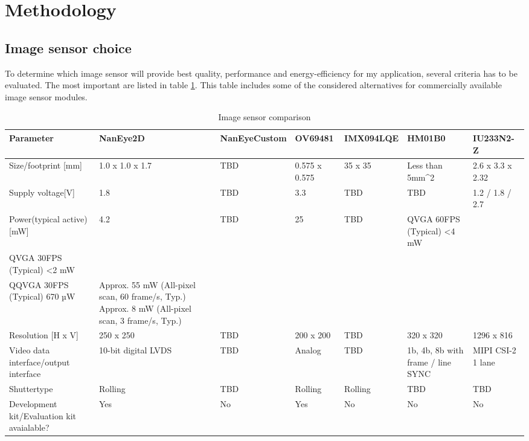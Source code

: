\newpage 
\section{Methodology}
\subsection{Image sensor choice}
To determine which image sensor will provide best quality, performance and energy-efficiency for my application, several criteria has to be evaluated. The most important are listed in table \ref{table:image_sensor_alternatives}. This table includes some of the considered alternatives for commercially available image sensor modules.

\begin {table}[H]

\centering
\resizebox{\textwidth}{!}
{\begin{tabular}{ | l | l | l | l | l | l | l |}
  \hline
  Parameter & NanEye2D  & NanEyeCustom & OV69481 & IMX094LQE & HM01B0 & IU233N2-Z \\ \hline
  Size/footprint [mm] & 1.0 x 1.0 x 1.7 & TBD  & 0.575 x 0.575 & 35 x 35 & Less than 5mm^2 & 2.6 x 3.3 x 2.32\\
  \hline
  Supply voltage[V] & 1.8 & TBD & 3.3 & TBD & TBD & 1.2 / 1.8 / 2.7 \\
  \hline
  Power(typical active) [mW] & 4.2 & TBD & 25 & TBD & 	QVGA 60FPS (Typical) <4 mW \\QVGA 30FPS (Typical) <2 mW \\
QQVGA 30FPS (Typical) 670 µW & Approx. 55 mW (All-pixel scan, 60 frame/s, Typ.) 
Approx. 8 mW (All-pixel scan, 3 frame/s, Typ.) \\
\hline
Resolution [H x V] & 250 x 250 & TBD & 200 x 200 & TBD & 320 x 320 & 1296 x 816 \\
\hline 
Video data interface/output interface & 10-bit digital LVDS & TBD & Analog & TBD & 1b, 4b, 8b with frame / line SYNC & MIPI CSI-2 1 lane\\
\hline
Shuttertype & Rolling & TBD & Rolling & Rolling & TBD & TBD \\
\hline
Development kit/Evaluation kit avaialable? & Yes & No & Yes & No & No & No\\

  
  
\end{tabular}}
\caption {Image sensor comparison} \label{table:image_sensor_alternatives} 
\end {table}